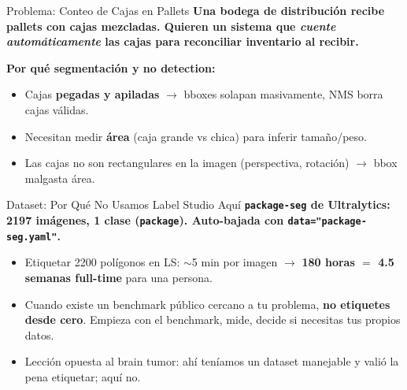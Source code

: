 \begin{frame}[shrink]{Problema: Conteo de Cajas en Pallets}
  \vspace{6pt}
  {\footnotesize\color{arcaDark}\bfseries
    Una bodega de distribuci\'on recibe pallets con cajas mezcladas.
    Quieren un sistema que \emph{cuente autom\'aticamente} las cajas
    para reconciliar inventario al recibir.}

  \vspace{12pt}
  {\footnotesize\color{arcaDark}\bfseries Por qu\'e segmentaci\'on y no detection:}

  \vspace{8pt}
  {\footnotesize
  \begin{itemize}\setlength{\itemsep}{5pt}
    \item[{\color{arcaRed}\scriptsize\faArrowRight}]
      Cajas \textbf{pegadas y apiladas} $\to$ bboxes solapan masivamente,
      NMS borra cajas v\'alidas.
    \item[{\color{arcaRed}\scriptsize\faArrowRight}]
      Necesitan medir \textbf{\'area} (caja grande vs chica) para
      inferir tama\~no/peso.
    \item[{\color{arcaRed}\scriptsize\faArrowRight}]
      Las cajas no son rectangulares en la imagen (perspectiva,
      rotaci\'on) $\to$ bbox malgasta \'area.
  \end{itemize}
  }
\end{frame}

\begin{frame}[shrink]{Dataset: Por Qu\'e No Usamos Label Studio Aqu\'i}
  \vspace{8pt}
  {\footnotesize\color{arcaDark}\bfseries
    \texttt{package-seg} de Ultralytics: 2197 im\'agenes, 1 clase
    (\texttt{package}). Auto-bajada con \texttt{data="package-seg.yaml"}.}

  \vspace{12pt}
  {\footnotesize
  \begin{itemize}\setlength{\itemsep}{6pt}
    \item[{\color{arcaRed}\scriptsize\faArrowRight}]
      Etiquetar 2200 pol\'igonos en LS: $\sim$5 min por imagen
      $\to$ \textbf{180 horas $=$ 4.5 semanas full-time} para una persona.
    \item[{\color{arcaRed}\scriptsize\faArrowRight}]
      Cuando existe un benchmark p\'ublico cercano a tu problema,
      \textbf{no etiquetes desde cero}. Empieza con el benchmark,
      mide, decide si necesitas tus propios datos.
    \item[{\color{codeGreen}\scriptsize\faArrowRight}]
      Lecci\'on opuesta al brain tumor: ah\'i ten\'iamos un dataset
      manejable y vali\'o la pena etiquetar; aqu\'i no.
  \end{itemize}
  }
\end{frame}

